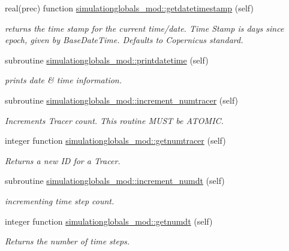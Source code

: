 \begin{DoxyCompactItemize}
real(prec) function \mbox{\hyperlink{namespacesimulationglobals__mod_a1fd33b50ae2216b3b7db074da1672398}{simulationglobals\+\_\+mod\+::getdatetimestamp}} (self)
\begin{DoxyCompactList}\small\item\em returns the time stamp for the current time/date. Time Stamp is days since epoch, given by Base\+Date\+Time. Defaults to Copernicus standard. \end{DoxyCompactList}\item 
subroutine \mbox{\hyperlink{namespacesimulationglobals__mod_abd0e28a5ec7733d0292dd8e631e96577}{simulationglobals\+\_\+mod\+::printdatetime}} (self)
\begin{DoxyCompactList}\small\item\em prints date \& time information. \end{DoxyCompactList}\item 
subroutine \mbox{\hyperlink{namespacesimulationglobals__mod_a3f11ed9f7735018950e1921ead871269}{simulationglobals\+\_\+mod\+::increment\+\_\+numtracer}} (self)
\begin{DoxyCompactList}\small\item\em Increments Tracer count. This routine M\+U\+ST be A\+T\+O\+M\+IC. \end{DoxyCompactList}\item 
integer function \mbox{\hyperlink{namespacesimulationglobals__mod_ac4915156236196940b31ff02d53af295}{simulationglobals\+\_\+mod\+::getnumtracer}} (self)
\begin{DoxyCompactList}\small\item\em Returns a new ID for a Tracer. \end{DoxyCompactList}\item 
subroutine \mbox{\hyperlink{namespacesimulationglobals__mod_ad983ee8885b275c6fa1369f1e158e078}{simulationglobals\+\_\+mod\+::increment\+\_\+numdt}} (self)
\begin{DoxyCompactList}\small\item\em incrementing time step count. \end{DoxyCompactList}\item 
integer function \mbox{\hyperlink{namespacesimulationglobals__mod_af313959d6cbfc4cb0ab330aa094511c5}{simulationglobals\+\_\+mod\+::getnumdt}} (self)
\begin{DoxyCompactList}\small\item\em Returns the number of time steps. \end{DoxyCompactList}\item 

\end{DoxyCompactItemize}
